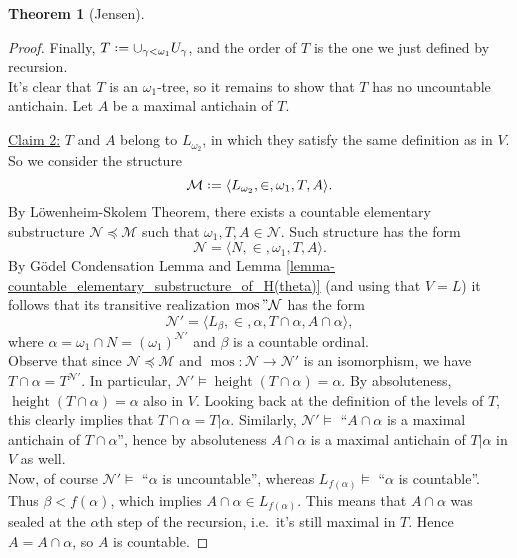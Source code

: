 \documentclass[12pt,a4paper]{report}
\theoremstyle{definition}
\newtheorem{theorem}{Theorem}[chapter] %
\theoremstyle{num.custom-title}
\newenvironment{claim}[1]{\par\noindent\underline{Claim#1:}\space}{} %
\DeclareMathOperator{\height}{height}
\DeclareMathOperator{\mos}{mos}
\newcommand{\M}{\mathcal{M}}
\newcommand*{\defeq}{\mathrel{\rlap{%
                     \raisebox{0.3ex}{$\cdot$}}%
                     \raisebox{-0.3ex}{$\cdot$}}%
                     =}
\begin{document}
\begin{theorem}[Jensen]
\begin{proof}
Finally, $T \defeq \cup_{\gamma < \omega_1} U_\gamma$, and the order of $T$ is the one we just defined by recursion.\\
It's clear that $T$ is an $\omega_1$-tree, so it remains to show that $T$ has no uncountable antichain. Let $A$ be a maximal antichain of $T$.\\[-7pt]
\begin{claim}{ 2}
$T$ and $A$ belong to $L_{\omega_2}$, in which they satisfy the same definition as in $V$.
\end{claim}\\[-7pt]

So we consider the structure
\[
\M \defeq \langle L_{\omega_2}, \in, \omega_1, T, A \rangle.
\]
By Löwenheim-Skolem Theorem, there exists a countable elementary substructure $\mathcal{N} \preceq \M$ such that $\omega_1, T, A \in \mathcal{N}$. Such structure has the form
\[
\mathcal{N} = \langle N, \in, \omega_1, T, A \rangle.
\]
By Gödel Condensation Lemma and Lemma \ref{lemma-countable_elementary_substructure_of_H(theta)} (and using that $V=L$) it follows that its transitive realization $\mos"\mathcal{N}$ has the form
\[
\mathcal{N'} = \langle L_\beta, \in, \alpha, T \cap \alpha, A \cap \alpha \rangle,
\]
where $\alpha = \omega_1 \cap N = (\omega_1)^{\mathcal{N'}}$ and $\beta$ is a countable ordinal.\\
Observe that since $\mathcal{N} \preceq \M$ and $\mos \colon \mathcal{N} \to \mathcal{N'}$ is an isomorphism, we have $T \cap \alpha = T^{\mathcal{N'}}$. In particular, $\mathcal{N'} \models \height(T \cap \alpha)=\alpha$. By absoluteness, $\height(T \cap \alpha)=\alpha$ also in $V$. Looking back at the definition of the levels of $T$, this clearly implies that $T \cap \alpha = T|\alpha$. Similarly, $\mathcal{N'} \models$ ``$A \cap \alpha$ is a maximal antichain of $T \cap \alpha$'', hence by absoluteness $A \cap \alpha$ is a maximal antichain of $T|\alpha$ in $V$ as well.\\
Now, of course $\mathcal{N'} \models$ ``$\alpha$ is uncountable'', whereas $L_{f(\alpha)} \models$ ``$\alpha$ is countable''. Thus $\beta < f(\alpha)$, which implies $A \cap \alpha \in L_{f(\alpha)}$. This means that $A \cap \alpha$ was sealed at the $\alpha$th step of the recursion, i.e.\ it's still maximal in $T$. Hence $A = A \cap \alpha$, so $A$ is countable.
\end{proof}
\end{theorem}
\end{document}
